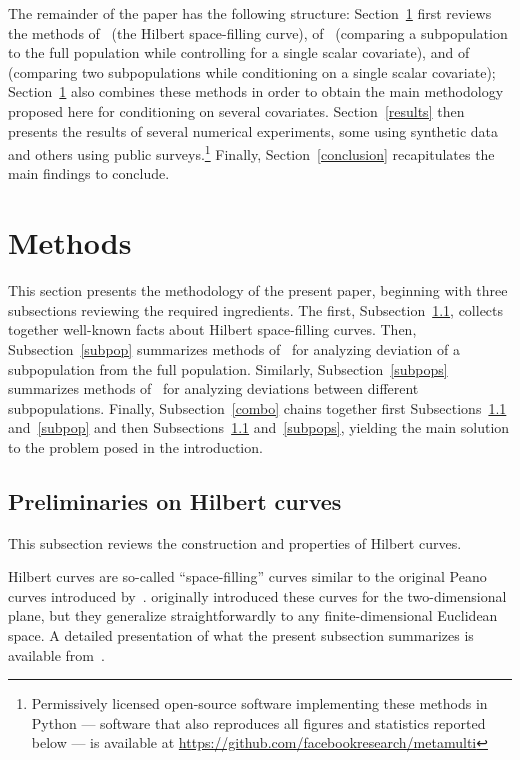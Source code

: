 \documentclass{article}
\begin{document}
The remainder of the paper has the following structure:
Section~\ref{methods} first reviews the methods
of~\cite{hilbert} (the Hilbert space-filling curve),
of~\cite{tygert_full} (comparing a subpopulation to the full population
while controlling for a single scalar covariate),
and of~\cite{tygert_two} (comparing two subpopulations
while conditioning on a single scalar covariate);
Section~\ref{methods} also combines these methods
in order to obtain the main methodology proposed here
for conditioning on several covariates.
Section~\ref{results} then presents the results
of several numerical experiments, some using synthetic data
and others using public surveys.\footnote{Permissively licensed
open-source software implementing these methods in Python
--- software that also reproduces all figures and statistics reported below
--- is available at \url{https://github.com/facebookresearch/metamulti}}
Finally, Section~\ref{conclusion} recapitulates the main findings to conclude.



\section{Methods}
\label{methods}

This section presents the methodology of the present paper,
beginning with three subsections reviewing the required ingredients.
The first, Subsection~\ref{Hilbert}, collects together well-known facts
about Hilbert space-filling curves.
Then, Subsection~\ref{subpop} summarizes methods of~\cite{tygert_full}
for analyzing deviation of a subpopulation from the full population.
Similarly, Subsection~\ref{subpops} summarizes methods of~\cite{tygert_two}
for analyzing deviations between different subpopulations.
Finally, Subsection~\ref{combo} chains together
first Subsections~\ref{Hilbert} and~\ref{subpop}
and then Subsections~\ref{Hilbert} and~\ref{subpops},
yielding the main solution to the problem posed in the introduction.


\subsection{Preliminaries on Hilbert curves}
\label{Hilbert}

This subsection reviews the construction and properties of Hilbert curves.

Hilbert curves are so-called ``space-filling'' curves similar
to the original Peano curves introduced by~\cite{peano}.
\cite{hilbert} originally introduced these curves
for the two-dimensional plane, but they generalize straightforwardly
to any finite-dimensional Euclidean space.
A detailed presentation of what the present subsection summarizes
is available from~\cite{moon-jagadish-faloutsos-saltz}.
\end{document}

